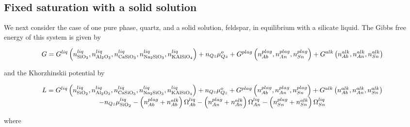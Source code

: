 \documentclass[11pt, titlepage, twoside]{article}
\begin{document}
\subsection{Fixed saturation with a solid solution}\label{MPSection:6C8BC2EE-DE8C-4B1C-A362-7B9B4A59AE8F}

We next consider the case of one pure phase, quartz, and a solid solution, feldspar, in equilibrium with a silicate liquid. The Gibbs free energy of this system is given by


\begin{MPEquation}[!ht]
\begin{equation}
G = {G^{liq}}\left( {n_{{\rm{Si}}{{\rm{O}}_2}}^{liq},n_{{\rm{A}}{{\rm{l}}_2}{{\rm{O}}_3}}^{liq},n_{{\rm{CaSi}}{{\rm{O}}_3}}^{liq},n_{{\rm{N}}{{\rm{a}}_{\rm{2}}}{\rm{Si}}{{\rm{O}}_3}}^{liq},n_{{\rm{KAlSi}}{{\rm{O}}_4}}^{liq}} \right) + {n_{Qz}}\mu _{Qz}^o + {G^{plag}}\left( {n_{Ab}^{plag},n_{An}^{plag},n_{Sn}^{plag}} \right) + {G^{alk}}\left( {n_{Ab}^{alk},n_{An}^{alk},n_{Sn}^{alk}} \right)
\end{equation}
\label{MPEquationElement:C1065AAB-ED83-4084-B272-521AA034A0A9}
\end{MPEquation}
and the Khorzhinskii potential by


\begin{MPEquation}[!ht]
\begin{equation}
\begin{array}{c}
L = {G^{liq}}\left( {n_{{\rm{Si}}{{\rm{O}}_2}}^{liq},n_{{\rm{A}}{{\rm{l}}_2}{{\rm{O}}_3}}^{liq},n_{{\rm{CaSi}}{{\rm{O}}_3}}^{liq},n_{{\rm{N}}{{\rm{a}}_{\rm{2}}}{\rm{Si}}{{\rm{O}}_3}}^{liq},n_{{\rm{KAlSi}}{{\rm{O}}_4}}^{liq}} \right) + {n_{Qz}}\mu _{Qz}^o + {G^{plag}}\left( {n_{Ab}^{plag},n_{An}^{plag},n_{Sn}^{plag}} \right) + {G^{alk}}\left( {n_{Ab}^{alk},n_{An}^{alk},n_{Sn}^{alk}} \right)\\
 { - {n_{Qz}}\mu _{{\rm{Si}}{{\rm{O}}_2}}^{liq} - \left( {n_{Ab}^{plag} + n_{Ab}^{alk}} \right)\Omega _{Ab}^{liq} - \left( {n_{An}^{plag} + n_{An}^{alk}} \right)\Omega _{An}^{liq} - \left( {n_{Sn}^{plag} + n_{Sn}^{alk}} \right)\Omega _{Sn}^{liq}}
\end{array}
\end{equation}
\label{MPEquationElement:437E2000-839B-4FFB-8EA5-451F96148926}
\end{MPEquation}
where
\end{document}
